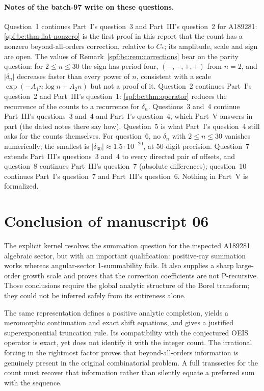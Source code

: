 \documentclass[11pt]{article}
\numberwithin{equation}{section}
\theoremstyle{definition}
\theoremstyle{remark}
\theoremstyle{definition}
\newcommand{\bcC}{C_{\!*}}
\begin{document}
\paragraph{Notes of the batch-97 write on these questions.}
Question~1 continues Part~I's question~3 and Part~III's question~2 for
A189281: \cref{spf:bc:thm:flat-nonzero} is the first proof in this report that
the count has a nonzero beyond-all-orders correction, relative to $\bcC$; its
amplitude, scale and sign are open. The values of
Remark~\ref{spf:bc:rem:corrections} bear on the parity question: for
$2\le n\le30$ the sign has period four, $(-,-,+,+)$ from $n=2$, and
$|\delta_n|$ decreases faster than every power of $n$, consistent with a
scale $\exp(-A_1n\log n+A_2n)$ but not a proof of it. Question~2 continues
Part~I's question~2 and Part~III's question~1: \cref{spf:bc:thm:operator}
reduces the recurrence of the counts to a recurrence for $\delta_n$.
Questions~3 and~4 continue Part~III's questions~3 and~4 and Part~I's
question~4, which Part~V answers in part (the dated notes there say how).
Question~5 is what Part~I's question~4 still asks for the counts themselves.
For question~6, no $\delta_n$ with $2\le n\le30$ vanishes numerically; the
smallest is $|\delta_{30}|\approx1.5\cdot10^{-20}$, at 50-digit precision.
Question~7 extends Part~III's questions~3 and~4 to every directed pair of
offsets, and question~8 continues Part~III's question~7 (absolute
differences); question~10 continues Part~I's question~7 and Part~III's
question~6. Nothing in Part~V is formalized.

\section{Conclusion of manuscript 06}

The explicit kernel resolves the summation question for the inspected A189281
algebraic sector, but with an important qualification: positive-ray summation
works whereas angular-sector 1-summability fails. It also supplies a sharp
large-order growth scale and proves that the correction coefficients are not
P-recursive. Those conclusions require the global analytic structure of the
Borel transform; they could not be inferred safely from its entireness alone.

The same representation defines a positive analytic completion, yields a
meromorphic continuation and exact shift equations, and gives a justified
superexponential truncation rule. Its compatibility with the conjectured OEIS
operator is exact, yet does not identify it with the integer count. The
irrational forcing in the rightmost factor proves that beyond-all-orders
information is genuinely present in the original combinatorial problem.
A full transseries for the count must recover that information rather than
silently equate a preferred sum with the sequence.
\end{document}
